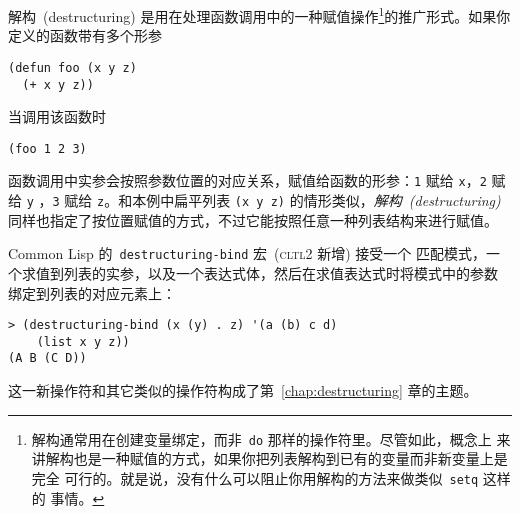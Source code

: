 解构~(destructuring) 是用在处理函数调用中的一种赋值操作\footnote{
解构通常用在创建变量绑定，而非~\texttt{do} 那样的操作符里。尽管如此，概念上
来讲解构也是一种赋值的方式，如果你把列表解构到已有的变量而非新变量上是完全
可行的。就是说，没有什么可以阻止你用解构的方法来做类似~\texttt{setq} 这样的
事情。}的推广形式。如果你定义的函数带有多个形参
\begin{lstlisting}
(defun foo (x y z)
  (+ x y z))
\end{lstlisting}
当调用该函数时
\begin{lstlisting}
(foo 1 2 3)
\end{lstlisting}
函数调用中实参会按照参数位置的对应关系，赋值给函数的形参：\texttt{1} 赋给 \texttt{x}，\texttt{2} 赋给 \texttt{y}
，\texttt{3} 赋给 \texttt{z}。和本例中扁平列表 \texttt{(x y z)} 的情形类似，\emph{解构~(destructuring)} 同样也指定了按位置赋值的方式，不过它能按照任意一种列表结构来进行赋值。

Common Lisp 的~\texttt{destructuring-bind} 宏~(\textsc{cltl}2 新增) 接受一个
匹配模式，一个求值到列表的实参，以及一个表达式体，然后在求值表达式时将模式中的参数
绑定到列表的对应元素上：
\begin{lstlisting}
> (destructuring-bind (x (y) . z) '(a (b) c d)
    (list x y z))
(A B (C D))
\end{lstlisting}
这一新操作符和其它类似的操作符构成了第~\ref{chap:destructuring} 章的主题。

